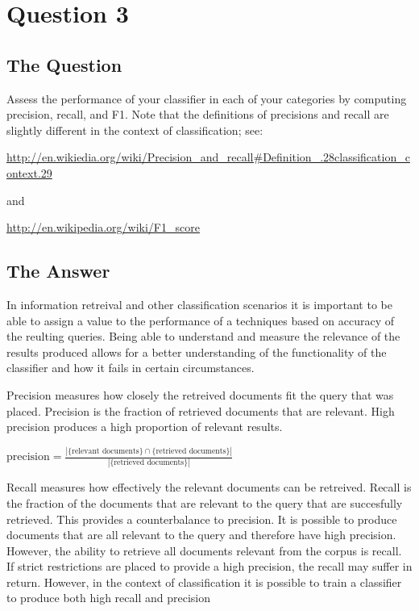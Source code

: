 \section{Question 3}

\subsection{The Question}

\begin{flushleft}

Assess the performance of your classifier in each of your categories
by computing precision, recall, and F1.  Note that the definitions
of precisions and recall are slightly different in the context of
classification; see:

\vspace{10pt}
\url{http://en.wikiedia.org/wiki/Precision_and_recall#Definition_.28classification_context.29}

and

\url{http://en.wikipedia.org/wiki/F1_score}

\end{flushleft}
\subsection{The Answer}

In information retreival and other classification scenarios it is important to be able to assign a value to the performance of a techniques based on accuracy of the reulting queries. Being able to understand  and measure the relevance of the results produced allows for a better understanding of the functionality of the classifier and how it fails in certain circumstances. 


Precision measures how closely the retreived documents fit the query that was placed. Precision is the fraction of retrieved documents that are relevant. High precision produces a high proportion of relevant results. 

\begin{center}
\Large
$  \text{precision}=\frac{|\{\text{relevant documents}\}\cap\{\text{retrieved documents}\}|}{|\{\text{retrieved documents}\}|}    $
\end{center}

Recall measures how effectively the relevant documents can be retreived. Recall is the fraction of the documents that are relevant to the query that are succesfully retrieved. This provides a counterbalance to precision. It is possible to produce documents that are all relevant to the query and therefore have high precision. However, the ability to retrieve all documents relevant from the corpus is recall. If strict restrictions are placed to provide a high precision, the recall may suffer in return. However, in the context of classification it is possible to train a classifier to produce both high recall and precision

